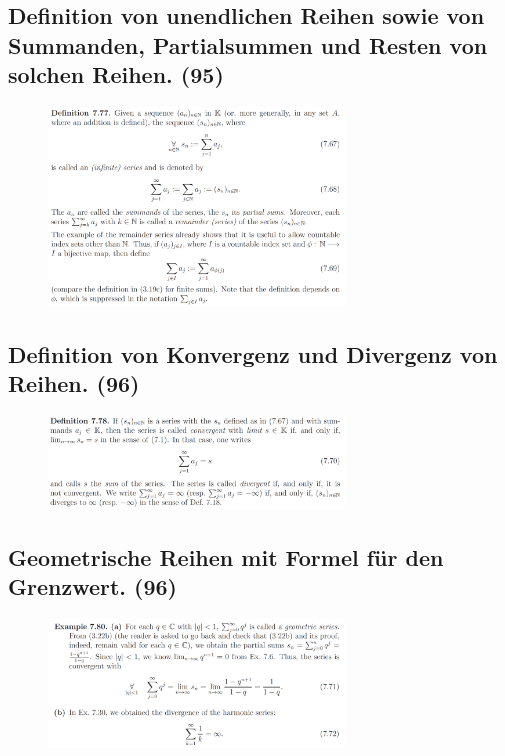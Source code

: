 \subsection{Definition von unendlichen Reihen sowie von Summanden, Partialsummen und Resten von solchen Reihen. (95)}

\begin{figure}[H] \centering
\includegraphics[width=0.7\textwidth]{media/8-1.png}
\end{figure}

\subsection{Definition von Konvergenz und Divergenz von Reihen. (96)}

\begin{figure}[H] \centering
\includegraphics[width=0.7\textwidth]{media/8-2.png}
\end{figure}

\subsection{Geometrische Reihen mit Formel für den Grenzwert. (96)}

\begin{figure}[H] \centering
\includegraphics[width=0.7\textwidth]{media/8-3.png}
\end{figure}

